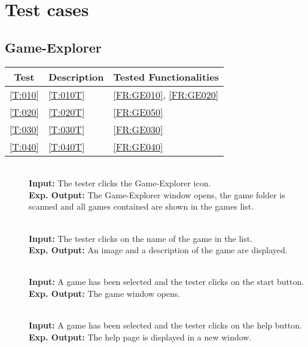 \section{Test cases}
\subsection{Game-Explorer}

\begin{tabular}{cll}
	\hline
	\textbf{Test} & \textbf{Description} & \textbf{Tested Functionalities} \\
	\hline
	\ref{T:010} & \ref{T:010T} & \ref{FR:GE010}, \ref{FR:GE020} \\
	\ref{T:020} & \ref{T:020T} & \ref{FR:GE050} \\
	\ref{T:030} & \ref{T:030T} & \ref{FR:GE030} \\
	\ref{T:040} & \ref{T:040T} & \ref{FR:GE040} \\
	\hline
\end{tabular}

\begin{description}
	\item[] \textbf{} \\
	\textbf{Input:} The tester clicks the Game-Explorer icon. \\
	\textbf{Exp. Output:} The Game-Explorer window opens, the game folder is scanned and all games contained are shown in the games list.
	
	\item[] \textbf{} \\
	\textbf{Input:} The tester clicks on the name of the game in the list. \\
	\textbf{Exp. Output:} An image and a description of the game are displayed.
	
	\item[] \textbf{} \\
	\textbf{Input:} A game has been selected and the tester clicks on the start button. \\
	\textbf{Exp. Output:} The game window opens.
	
	\item[] \textbf{} \\
	\textbf{Input:} A game has been selected and the tester clicks on the help button. \\
	\textbf{Exp. Output:} The help page is displayed in a new window.
\end{description}

